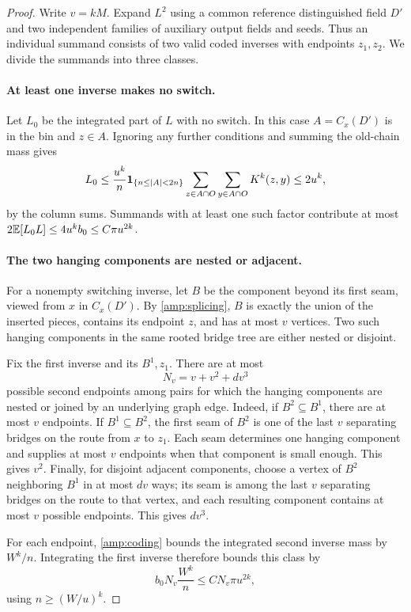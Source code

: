 \begin{proof}
Write $v=kM$.  Expand $L^2$ using a common reference distinguished field
$D'$ and two independent families of auxiliary output fields and seeds.
Thus an individual summand consists of two valid coded inverses with
endpoints $z_1,z_2$.  We divide the summands into three classes.

\paragraph{At least one inverse makes no switch.}
Let $L_0$ be the integrated part of $L$ with no switch.  In this case
$A=C_x(D')$ is in the bin and $z\in A$.  Ignoring any further conditions
and summing the old-chain mass gives
\[
 L_0\le\frac{u^k}{n}\mathbf 1_{\{n\le|A|<2n\}}
          \sum_{z\in A\cap O}\sum_{y\in A\cap O}K^k(z,y)
 \le 2u^k,
\]
by the column sums.  Summands with at least one such factor contribute
at most $2\mathbb E[L_0L]\le4u^kb_0\le C\pi u^{2k}$.

\paragraph{The two hanging components are nested or adjacent.}
For a nonempty switching inverse, let $B$ be the component beyond its
first seam, viewed from $x$ in $C_x(D')$.  By \cref{amp:splicing}, $B$ is
exactly the union of the inserted pieces, contains its endpoint $z$,
and has at most $v$ vertices.  Two such hanging components in the same
rooted bridge tree are either nested or disjoint.

Fix the first inverse and its $B^1,z_1$.  There are at most
\[
 N_v=v+v^2+dv^3
\]
possible second endpoints among pairs for which the hanging components
are nested or joined by an underlying graph edge.  Indeed, if
$B^2\subseteq B^1$, there are at most $v$ endpoints.  If
$B^1\subseteq B^2$, the first seam of $B^2$ is one of the last $v$
separating bridges on the route from $x$ to $z_1$.  Each seam determines
one hanging component and supplies at most $v$ endpoints when that
component is small enough.  This gives $v^2$.  Finally, for disjoint
adjacent components, choose a vertex of $B^2$ neighboring $B^1$ in at
most $dv$ ways; its seam is among the last $v$ separating bridges on
the route to that vertex, and each resulting component contains at
most $v$ possible endpoints.  This gives $dv^3$.

For each endpoint, \cref{amp:coding} bounds the integrated second
inverse mass by $W^k/n$.  Integrating the first inverse therefore bounds
this class by
\[
 b_0N_v\frac{W^k}{n}\le C N_v\pi u^{2k},
\]
using $n\ge(W/u)^k$.


\end{proof}
